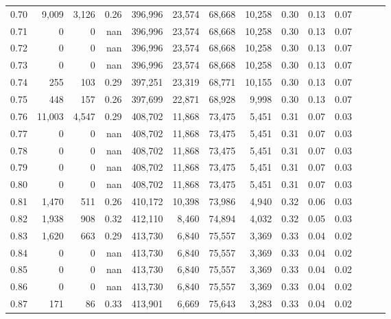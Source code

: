 \begin{tabular}{rrrrrrrrrrrrrr}
0.70 &   9,009 &  3,126 &  0.26 &  396,996 &   23,574 &  68,668 &  10,258 &  0.30 &  0.13 &      0.07 \\
0.71 &       0 &      0 &   nan &  396,996 &   23,574 &  68,668 &  10,258 &  0.30 &  0.13 &      0.07 \\
0.72 &       0 &      0 &   nan &  396,996 &   23,574 &  68,668 &  10,258 &  0.30 &  0.13 &      0.07 \\
0.73 &       0 &      0 &   nan &  396,996 &   23,574 &  68,668 &  10,258 &  0.30 &  0.13 &      0.07 \\
0.74 &     255 &    103 &  0.29 &  397,251 &   23,319 &  68,771 &  10,155 &  0.30 &  0.13 &      0.07 \\
0.75 &     448 &    157 &  0.26 &  397,699 &   22,871 &  68,928 &   9,998 &  0.30 &  0.13 &      0.07 \\
0.76 &  11,003 &  4,547 &  0.29 &  408,702 &   11,868 &  73,475 &   5,451 &  0.31 &  0.07 &      0.03 \\
0.77 &       0 &      0 &   nan &  408,702 &   11,868 &  73,475 &   5,451 &  0.31 &  0.07 &      0.03 \\
0.78 &       0 &      0 &   nan &  408,702 &   11,868 &  73,475 &   5,451 &  0.31 &  0.07 &      0.03 \\
0.79 &       0 &      0 &   nan &  408,702 &   11,868 &  73,475 &   5,451 &  0.31 &  0.07 &      0.03 \\
0.80 &       0 &      0 &   nan &  408,702 &   11,868 &  73,475 &   5,451 &  0.31 &  0.07 &      0.03 \\
0.81 &   1,470 &    511 &  0.26 &  410,172 &   10,398 &  73,986 &   4,940 &  0.32 &  0.06 &      0.03 \\
0.82 &   1,938 &    908 &  0.32 &  412,110 &    8,460 &  74,894 &   4,032 &  0.32 &  0.05 &      0.03 \\
0.83 &   1,620 &    663 &  0.29 &  413,730 &    6,840 &  75,557 &   3,369 &  0.33 &  0.04 &      0.02 \\
0.84 &       0 &      0 &   nan &  413,730 &    6,840 &  75,557 &   3,369 &  0.33 &  0.04 &      0.02 \\
0.85 &       0 &      0 &   nan &  413,730 &    6,840 &  75,557 &   3,369 &  0.33 &  0.04 &      0.02 \\
0.86 &       0 &      0 &   nan &  413,730 &    6,840 &  75,557 &   3,369 &  0.33 &  0.04 &      0.02 \\
0.87 &     171 &     86 &  0.33 &  413,901 &    6,669 &  75,643 &   3,283 &  0.33 &  0.04 &      0.02 \\

\end{tabular}
